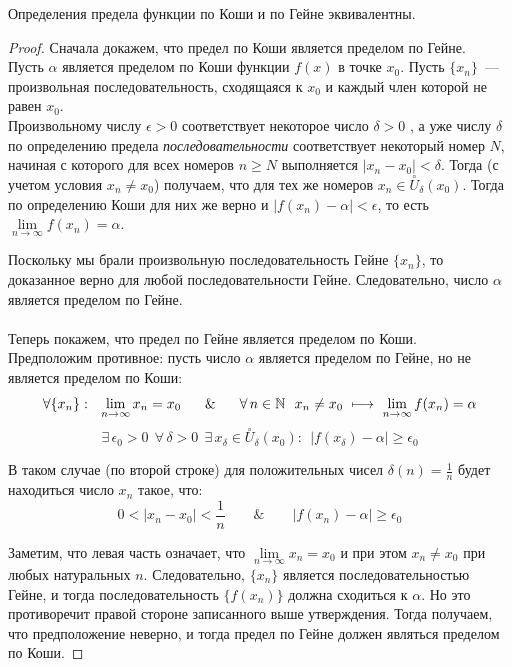 \begin{theorem}
Определения предела функции по Коши и по Гейне эквивалентны.

\begin{proof}
Сначала докажем, что предел по Коши является пределом по Гейне. \\
Пусть \(\alpha\) является пределом по Коши функции \(f(x)\) в точке \(x_{0}\).
Пусть \(\{x_{n}\}\)~--- произвольная последовательность, сходящаяся к \(x_{0}\)
и каждый член которой не равен \(x_{0}\). \\

Произвольному числу \(\epsilon > 0\) соответствует некоторое число \(\delta > 0\)
, а уже числу \(\delta\) по определению предела \textit{последовательности}
соответствует некоторый номер \(N\), начиная с которого для всех номеров \(n \geq N\)
выполняется \(|x_{n} - x_{0}| < \delta\). Тогда (с учетом условия \(x_{n} \neq x_{0}\))
получаем, что для тех же номеров \(x_{n} \in \overset{\circ}{U}_{\delta}(x_{0})\).
Тогда по определению Коши для них же верно и \(|f(x_{n}) - \alpha| < \epsilon\),
то есть \(\lim\limits_{n \to \infty}{f(x_{n})} = \alpha\).

Поскольку мы брали произвольную последовательность Гейне \(\{x_{n}\}\), то доказанное
верно для любой последовательности Гейне. Следовательно, число \(\alpha\)
является пределом по Гейне.\\
\\
Теперь покажем, что предел по Гейне является пределом по Коши.\\
Предположим противное: пусть число \(\alpha\) является пределом по Гейне,
но не является пределом по Коши:
\[
\forall \{x_{n}\} : ~~ \lim_{ n \to \infty } x_{n} = x_{0} \hspace{6mm} \& \hspace{6mm}
\forall \, n \in \mathbb{N} ~~ x_{n} \neq x_{0} ~ \longmapsto ~ \lim_{ n \to \infty }f(x_{n}) = \alpha
\]
\[ \exists \, \epsilon_{0} > 0 ~~ \forall \, \delta > 0 ~~ \exists \, x_{\delta}
\in \overset{\circ}{U}_{\delta} (x_{0}) : ~~ |f(x_{\delta}) - \alpha| \geq \epsilon_{0}
\]

В таком случае (по второй строке) для положительных чисел \(\delta(n) = \frac{1}{n}\)
будет находиться число \(x_{n}\) такое, что:
\[
0 < |x_{n} - x_{0}| < \frac{1}{n} \qquad \& \qquad|f(x_{n}) - \alpha| \geq \epsilon_{0}
\]

Заметим, что левая часть означает, что \(\lim\limits_{n \to \infty}{x_{n}} = x_{0}\)
и при этом \(x_{n} \neq x_{0}\) при любых натуральных \(n\).
Следовательно, \(\{x_{n}\}\) является последовательностью Гейне, и тогда последовательность
\(\{f(x_{n})\}\) должна сходиться к \(\alpha\). Но это противоречит правой стороне
записанного выше утверждения. Тогда получаем, что предположение неверно, и тогда
предел по Гейне должен являться пределом по Коши.
\end{proof}
\end{theorem}

